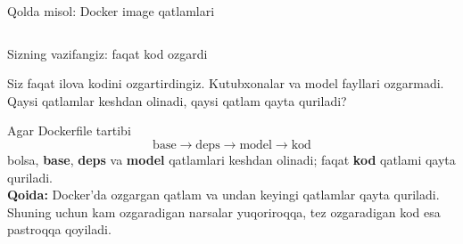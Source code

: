 \documentclass[aspectratio=169,11pt]{beamer}
\newcommand{\uzq}{\textquotesingle{}}   %
\begin{document}
\begin{frame}{Qo\uzq{}lda misol: Docker image qatlamlari}
\begin{columns}[T,totalwidth=\textwidth]
\begin{column}{0.42\textwidth}
    \end{column}
  \end{columns}
\end{frame}

\begin{frame}{Sizning vazifangiz: faqat kod o\uzq{}zgardi}
  \small

  \begin{tcolorbox}[warnbox,title=Savol,top=2pt,bottom=2pt]
    Siz faqat ilova kodini o\uzq{}zgartirdingiz.
    Kutubxonalar va model fayllari o\uzq{}zgarmadi.
    Qaysi qatlamlar keshdan olinadi, qaysi qatlam qayta quriladi?
  \end{tcolorbox}

  \pause

  \vspace{3pt}

  \begin{tcolorbox}[okbox,title=Javob,top=2pt,bottom=2pt]
    Agar Dockerfile tartibi
    \[
      \text{base} \rightarrow \text{deps} \rightarrow \text{model} \rightarrow \text{kod}
    \]
    bo\uzq{}lsa, \textbf{base}, \textbf{deps} va \textbf{model} qatlamlari
    keshdan olinadi; faqat \textbf{kod} qatlami qayta quriladi.\\[3pt]

    \footnotesize
    \textbf{Qoida:} Docker’da o\uzq{}zgargan qatlam va undan keyingi qatlamlar
    qayta quriladi. Shuning uchun kam o\uzq{}zgaradigan narsalar
    yuqoriroqqa, tez o\uzq{}zgaradigan kod esa pastroqqa qo\uzq{}yiladi.
  \end{tcolorbox}
\end{frame}
\end{document}
